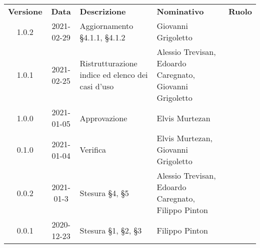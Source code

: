 
{
\renewcommand{\arraystretch}{1.5}
\centering
\begin{longtable}{ c c  C{3.5cm}  C{4cm}  c }
    \rowcolor{\primaryColor}
    \textcolor{\secondaryColor}{
    \textbf{Versione}}     & \textcolor{\secondaryColor}{\textbf{Data}}       & \textcolor{\secondaryColor}
    {\textbf{Descrizione}} & \textcolor{\secondaryColor}{\textbf{Nominativo}} & \textcolor{\secondaryColor}{\textbf{Ruolo}}                                                                         \\



    1.0.2                  & 2021-02-29                                       & Aggiornamento §4.1.1, §4.1.2                         & Giovanni Grigoletto                                      & \analista{}    \\

    1.0.1                  & 2021-02-25                                        & Ristrutturazione indice ed elenco dei casi d'uso                              & Alessio Trevisan, Edoardo Caregnato, Giovanni Grigoletto & \analista{}    \\

    1.0.0                  & 2021-01-05                                       & Approvazione                                & Elvis Murtezan                                      & \responsabile{} \\

    0.1.0                  & 2021-01-04                                       & Verifica                                    & Elvis Murtezan, Giovanni Grigoletto                 & \verificatore{} \\

    0.0.2                  & 2021-01-3                                        & Stesura §4, §5                              & Alessio Trevisan, Edoardo Caregnato, Filippo Pinton & \analista{}    \\

    0.0.1                  & 2020-12-23                                       & Stesura §1, §2, §3                          & Filippo Pinton                                      & \analista{}    \\
\end{longtable}
}